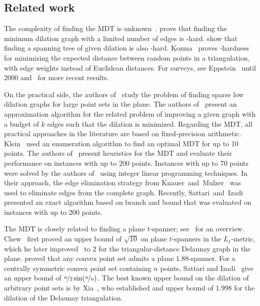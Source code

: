 \subsection{Related work}
\label{subsec:related}
The complexity of finding the MDT is unknown~\cite{DBLP:books/el/00/Eppstein00}.
\cite{DBLP:journals/ijcga/GiannopoulosKKKM10} prove that finding the minimum dilation graph with a limited number of edges is \NP-hard.
\cite{DBLP:journals/comgeo/CheongHL08} show that finding a spanning tree of given dilation is also \NP-hard.
Kozma~\cite{DBLP:conf/esa/Kozma12} proves \NP-hardness for minimizing the expected distance between random points in a triangulation,
with edge weights instead of Euclidean distances.
For surveys, see 
Eppstein~\cite{DBLP:books/el/00/Eppstein00} until 2000
and~\cite{DBLP:books/daglib/0017763} for more recent results.

On the practical side, %
the authors of~\cite{DBLP:journals/corr/abs-2305-11312} study the problem of finding sparse low dilation graphs for large point sets in the plane.
The authors of~\cite{DBLP:conf/esa/BuchinBGW24} present an approximation algorithm for the related problem of improving a given graph with a budget of $k$ edges such that the dilation is minimized.
Regarding the MDT, all practical approaches in the literature are based on fixed-precision arithmetic.
Klein~\cite{klein2006effiziente} used an enumeration algorithm to find an optimal MDT for up to \num{10} points. 
The authors of~\cite{DBLP:journals/heuristics/DorzanLMH14} present heuristics for the MDT and evaluate their performance on instances with up to \num{200} points.
Instances with up to \num{70} points were solved by 
the authors of~\cite{DBLP:conf/cccg/BrandtGSR14} using integer linear programming techniques.
In their approach, the edge elimination strategy from Knauer~and~Mulzer~\cite{DBLP:conf/ewcg/KnauerM05} was used to eliminate edges from the complete graph.
Recently, Sattari~and~Izadi~\cite{DBLP:journals/jgo/SattariI17} presented an exact algorithm based on branch and bound that was evaluated on instances with up to \num{200} points.

The MDT is closely related to finding a plane $t$-spanner; see~\cite{mitchell2017proximity} for an overview.
Chew~\cite{DBLP:conf/compgeom/Chew86} first proved an upper bound of $\sqrt{10}$ on plane $t$-spanners in the $L_1$-metric,
which he later improved~\cite{DBLP:journals/jcss/Chew89} to $2$ for the triangular-distance Delaunay graph in the plane.
\cite{DBLP:journals/jocg/BiniazAMSBC16} proved that any convex point set admits a plane $1.88$-spanner. 
For a centrally symmetric convex point set containing $n$ points, Sattari and Izadi~\cite{DBLP:journals/ipl/SattariI18} give an upper bound of $\nicefrac{n}{2} \sin(\nicefrac{\pi}{n})$.
The best known upper bound on the dilation of arbitrary point sets is by Xia~\cite{DBLP:journals/siamcomp/Xia13}, 
who established and upper bound of \num{1.998} for the dilation of the Delaunay triangulation.


